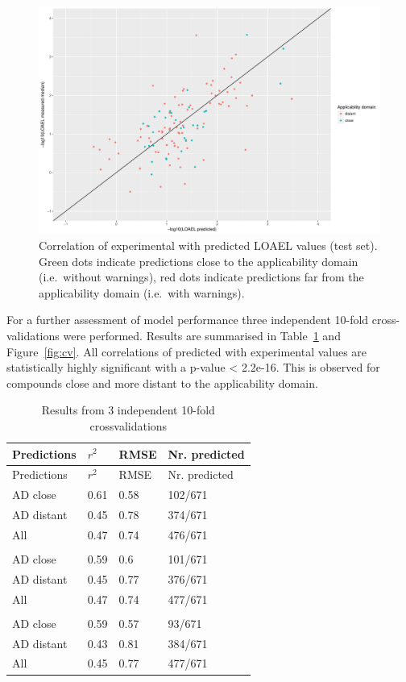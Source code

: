 \documentclass[]{achemso}
\begin{document}
\begin{figure}
\centering
\includegraphics{figures/prediction-test-correlation.pdf}
\caption{Correlation of experimental with predicted LOAEL values (test
set). Green dots indicate predictions close to the applicability domain
(i.e.~without warnings), red dots indicate predictions far from the
applicability domain (i.e.~with warnings).}\label{fig:corr}
\end{figure}

For a further assessment of model performance three independent 10-fold
cross-validations were performed. Results are summarised in
Table~\ref{tbl:cv} and Figure~\ref{fig:cv}. All correlations of
predicted with experimental values are statistically highly significant
with a p-value \textless{} 2.2e-16. This is observed for compounds close
and more distant to the applicability domain.

\hypertarget{tbl:cv}{}
\begin{longtable}[]{@{}llll@{}}
\caption{\label{tbl:cv}Results from 3 independent 10-fold
crossvalidations }\tabularnewline
\toprule
Predictions & \(r^2\) & RMSE & Nr. predicted\tabularnewline
\midrule
\endfirsthead
\toprule
Predictions & \(r^2\) & RMSE & Nr. predicted\tabularnewline
\midrule
\endhead
AD close & 0.61 & 0.58 & 102/671\tabularnewline
AD distant & 0.45 & 0.78 & 374/671\tabularnewline
All & 0.47 & 0.74 & 476/671\tabularnewline
& &\tabularnewline
AD close & 0.59 & 0.6 & 101/671\tabularnewline
AD distant & 0.45 & 0.77 & 376/671\tabularnewline
All & 0.47 & 0.74 & 477/671\tabularnewline
& &\tabularnewline
AD close & 0.59 & 0.57 & 93/671\tabularnewline
AD distant & 0.43 & 0.81 & 384/671\tabularnewline
All & 0.45 & 0.77 & 477/671\tabularnewline
\bottomrule
\end{longtable}
\end{document}
